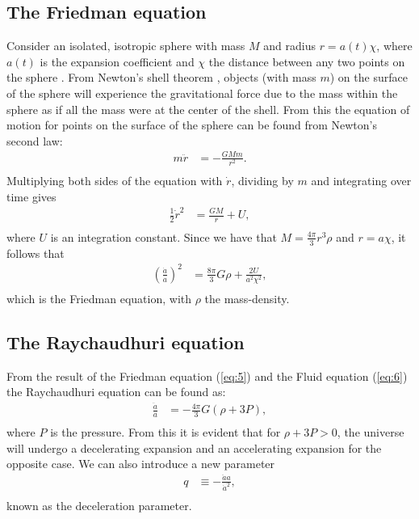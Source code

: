 \documentclass[a4paper, 11pt]{FSKH_623_Report}
\numberwithin{equation}{section}
\begin{document}
\subsection{The Friedman equation}
Consider an isolated, isotropic sphere with mass $M$ and radius $r=a(t)\chi$, where $a(t)$ is the expansion coefficient and $\chi$ the distance between any two points on the sphere \citep{notes4}. From Newton's shell theorem \citep{IronShell}, objects (with mass $m$) on the surface of the sphere will experience the gravitational force due to the mass within the sphere as if all the mass were at the center of the shell. From this the equation of motion for points on the surface of the sphere can be found from Newton's second law:
\begin{equation}
\begin{split}
m\ddot{r} &= -\frac{GMm}{r^{2}}.\\
\end{split}
\end{equation}
Multiplying both sides of the equation with $\dot{r}$, dividing by $m$ and integrating over time gives
\begin{equation}
\begin{split}
\frac{1}{2}\dot{r}^2 &= \frac{GM}{r}+U,\\
\end{split}
\end{equation}
where $U$ is an integration constant. Since we have that $M=\frac{4\pi}{3}r^{3}\rho$ and $r=a\chi$, it follows that
\begin{equation}\label{eq:5}
\begin{split}
\left(\frac{\dot{a}}{a}\right)^{2} &= \frac{8\pi}{3}G\rho+\frac{2U}{a^{2}\chi^{2}},\\
\end{split}
\end{equation}
which is the Friedman equation, with $\rho$ the mass-density.
\subsection{The Raychaudhuri equation}
From the result of the Friedman equation (\ref{eq:5}) and the Fluid equation (\ref{eq:6}) the Raychaudhuri equation can be found as:
\begin{equation}\label{eq:RayEq}
\begin{split}
\frac{\ddot{a}}{a} &= -\frac{4\pi}{3}G\left(\rho +3P\right),\\
\end{split}
\end{equation}
where $P$ is the pressure. From this it is evident that for $\rho +3P > 0$, the universe will undergo a decelerating expansion and an accelerating expansion for the opposite case. We can also introduce a new parameter
\begin{equation}\label{eq:Deceleration}
\begin{split}
q &\equiv -\frac{\ddot{a}a}{\dot{a}^{2}},     \\
\end{split}
\end{equation}
known as the deceleration parameter.
\end{document}
